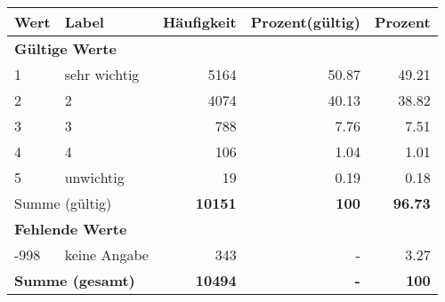      \begin{longtable}{lXrrr}
     \toprule
     \textbf{Wert} & \textbf{Label} & \textbf{Häufigkeit} & \textbf{Prozent(gültig)} & \textbf{Prozent} \\
     \endhead
     \midrule
     \multicolumn{5}{l}{\textbf{Gültige Werte}}\\

     1 &
     \multicolumn{1}{X}{ sehr wichtig   } &


       \num{5164} &
       \num[round-mode=places,round-precision=2]{50.87} &
         \num[round-mode=places,round-precision=2]{49.21} \\

     2 &
     \multicolumn{1}{X}{ 2   } &


       \num{4074} &
       \num[round-mode=places,round-precision=2]{40.13} &
         \num[round-mode=places,round-precision=2]{38.82} \\

     3 &
     \multicolumn{1}{X}{ 3   } &


       \num{788} &
       \num[round-mode=places,round-precision=2]{7.76} &
         \num[round-mode=places,round-precision=2]{7.51} \\

     4 &
     \multicolumn{1}{X}{ 4   } &


       \num{106} &
       \num[round-mode=places,round-precision=2]{1.04} &
         \num[round-mode=places,round-precision=2]{1.01} \\

     5 &
     \multicolumn{1}{X}{ unwichtig   } &


       \num{19} &
       \num[round-mode=places,round-precision=2]{0.19} &
         \num[round-mode=places,round-precision=2]{0.18} \\
     \midrule
     \multicolumn{2}{l}{Summe (gültig)} &
       \textbf{\num{10151}} &
     \textbf{\num{100}} &
       \textbf{\num[round-mode=places,round-precision=2]{96.73}} \\
     \multicolumn{5}{l}{\textbf{Fehlende Werte}}\\
       -998 &
       keine Angabe &
         \num{343} &
        - &
         \num[round-mode=places,round-precision=2]{3.27} \\
     \midrule
     \multicolumn{2}{l}{\textbf{Summe (gesamt)}} &
          \textbf{\num{10494}} &
        \textbf{-} &
        \textbf{\num{100}} \\
     \bottomrule
     \end{longtable}
     
